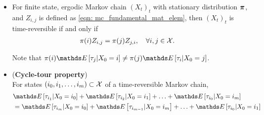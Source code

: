 \documentclass[11pt]{article}
\begin{document}
\begin{itemize}
\item 
\begin{proposition}
For finite state, ergodic Markov chain $(X_t)_t$ with stationary distribution $\boldsymbol{\pi}$, and $Z_{i,j}$ is defined as \eqref{eqn: mc_fundamental_mat_elem}, then $(X_t)_t$ is time-reversible if and only if
\begin{align}
\pi(i)Z_{i,j} &=  \pi(j)Z_{j,i},\quad \forall i, j\in {\mathcal X}.  \label{eqn: mc_rev_fundamental_mat}
\end{align}
\end{proposition}
Note that $\pi(i)\E{}{\tau_{j} | X_0 = i}  \neq  \pi(j)\E{}{\tau_{i} | X_0 = j}$.

\item \begin{theorem} (\textbf{Cycle-tour property})\\
For states $(i_0,i_1,\ldots, i_{m}) \subset {\mathcal X}$ of a time-reversible Markov chain, 
\begin{align}
&\E{}{\tau_{i_1} | X_0 = i_0} + \E{}{\tau_{i_2} | X_0 = i_1} + \ldots + \E{}{\tau_{i_0} | X_0 = i_{m}} \nonumber \\
&= \E{}{\tau_{i_m} | X_0 = i_{0}} + \E{}{\tau_{i_{m-1}} | X_0 = i_m} + \ldots +  \E{}{\tau_{i_0} | X_0 = i_1}\label{eqn: mc_cycle_tour}
\end{align}
\end{theorem}
\end{itemize}
\end{document}
